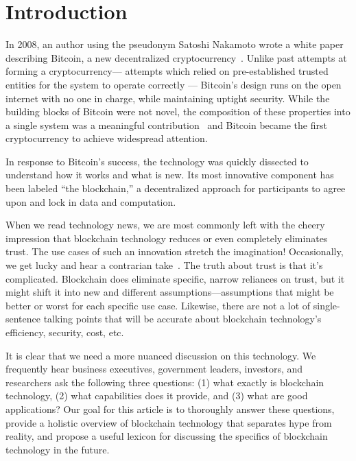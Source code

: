 
\section{Introduction}

In 2008, an author using the pseudonym Satoshi Nakamoto wrote a white paper describing Bitcoin, a new decentralized cryptocurrency~\cite{Nak08}. Unlike past attempts at forming a cryptocurrency--- attempts which relied on pre-established trusted entities for the system to operate correctly --- Bitcoin's design runs on the open internet with no one in charge, while maintaining uptight security. While the building blocks of Bitcoin were not novel, the composition of these properties into a single system was a meaningful contribution~\cite{Narayanan17} and Bitcoin became the first cryptocurrency to achieve widespread attention.

In response to Bitcoin's success, the technology was quickly dissected to understand how it works and what is new. Its most innovative component has been labeled ``the blockchain,'' a decentralized approach for participants to agree upon and lock in data and computation.

When we read technology news, we are most commonly left with the cheery impression that blockchain technology reduces or even completely eliminates trust. The use cases of such an innovation stretch the imagination! Occasionally, we get lucky and hear a contrarian take~\cite{Sch19}. The truth about trust is that it's complicated. Blockchain does eliminate specific, narrow reliances on trust, but it might shift it into new and different assumptions---assumptions that might be better or worst for each specific use case. Likewise, there are not a lot of single-sentence talking points that will be accurate about blockchain technology's efficiency, security, cost, etc. 

It is clear that we need a more nuanced discussion on this technology. We frequently hear business executives, government leaders, investors, and researchers ask the following three questions: (1) what exactly is blockchain technology, (2) what capabilities does it provide, and (3) what are good applications? Our goal for this article is to thoroughly answer these questions,  provide a holistic overview of blockchain technology that separates hype from reality, and propose a useful lexicon for discussing the specifics of blockchain technology in the future.

